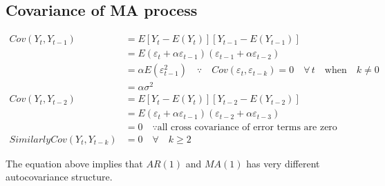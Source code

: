 \documentclass{book}
\begin{document}
\subsection{Covariance of MA process}\label{sscovma}
		\begin{equation}
			\begin{split}
			Cov(Y_t,Y_{t-1}) & = E[Y_t-E(Y_t)][Y_{t-1}-E(Y_{t-1})]\\
			& = E(\varepsilon_t+\alpha \varepsilon_{t-1})(\varepsilon_{t-1}+\alpha \varepsilon_{t-2})\\
			& =\alpha E(\varepsilon_{t-1}^2) \quad \because \quad Cov(\varepsilon_t,\varepsilon_{t-k})=0 \quad \forall \,t \quad \text{when} \quad k\neq 0\\ 
			& = \alpha \sigma^2 \\
			Cov(Y_t, Y_{t-2}) & = E[Y_t-E(Y_t)][Y_{t-2}-E(Y_{t-2})]\\
			& = E(\varepsilon_t+\alpha \varepsilon_{t-1})(\varepsilon_{t-2}+\alpha \varepsilon_{t-3})\\
			& = 0 \quad \because \text{all cross covariance of error terms are zero}\\ 
			Similarly Cov(Y_t,Y_{t-k}) & = 0 \quad \forall \quad k\ge 2
			\end{split}
			\label{eqmacov}
		\end{equation}

The equation above implies that $AR(1)$ and $MA(1)$ has very different autocovariance structure. 
\end{document}
